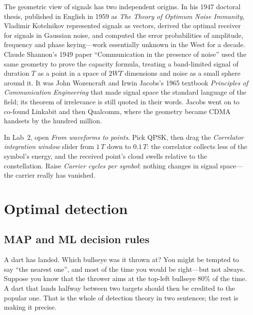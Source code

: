 \begin{history}
The geometric view of signals has two independent origins. In his 1947 doctoral thesis, published
in English in 1959 as \emph{The Theory of Optimum Noise Immunity}, Vladimir Kotelnikov represented
signals as vectors, derived the optimal receiver for signals in Gaussian noise, and computed the
error probabilities of amplitude, frequency and phase keying---work essentially unknown in the
West for a decade. Claude Shannon's 1949 paper ``Communication in the presence of noise'' used
the same geometry to prove the capacity formula, treating a band-limited signal of duration $T$
as a point in a space of $2WT$ dimensions and noise as a small sphere around it. It was John
Wozencraft and Irwin Jacobs's 1965 textbook \emph{Principles of Communication Engineering} that
made signal space the standard language of the field; its theorem of irrelevance is still quoted
in their words. Jacobs went on to co-found Linkabit and then Qualcomm, where the geometry became
CDMA handsets by the hundred million.
\end{history}

\begin{tryit}
In Lab~2, open \emph{From waveforms to points}. Pick QPSK, then drag the \emph{Correlator
integration window} slider from $1\,T$ down to $0.1\,T$: the correlator collects less of the
symbol's energy, and the received point's cloud swells relative to the constellation. Raise
\emph{Carrier cycles per symbol}: nothing changes in signal space---the carrier really has vanished.
\end{tryit}

\section{Optimal detection}
\label{sec:ch09:detection}

\subsection{MAP and ML decision rules}

A dart has landed. Which bullseye was it thrown at? You might be tempted to say ``the nearest
one'', and most of the time you would be right---but not always. Suppose you know that the
thrower aims at the top-left bullseye 80\% of the time. A dart that lands halfway between two
targets should then be credited to the popular one. That is the whole of detection theory in two
sentences; the rest is making it precise.

